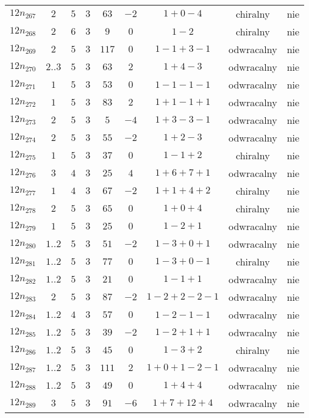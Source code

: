 \begin{longtable}{ccccccccc}
$12n_{267}$ & $2$ & $5$ & $3$ & $63$ & $-2$ & $1+0-4$ & chiralny & nie \\
$12n_{268}$ & $2$ & $6$ & $3$ & $9$ & $0$ & $1-2$ & chiralny & nie \\
$12n_{269}$ & $2$ & $5$ & $3$ & $117$ & $0$ & $1-1+3-1$ & odwracalny & nie \\
$12n_{270}$ & $2..3$ & $5$ & $3$ & $63$ & $2$ & $1+4-3$ & odwracalny & nie \\
$12n_{271}$ & $1$ & $5$ & $3$ & $53$ & $0$ & $1-1-1-1$ & odwracalny & nie \\
$12n_{272}$ & $1$ & $5$ & $3$ & $83$ & $2$ & $1+1-1+1$ & odwracalny & nie \\
$12n_{273}$ & $2$ & $5$ & $3$ & $5$ & $-4$ & $1+3-3-1$ & odwracalny & nie \\
$12n_{274}$ & $2$ & $5$ & $3$ & $55$ & $-2$ & $1+2-3$ & odwracalny & nie \\
$12n_{275}$ & $1$ & $5$ & $3$ & $37$ & $0$ & $1-1+2$ & chiralny & nie \\
$12n_{276}$ & $3$ & $4$ & $3$ & $25$ & $4$ & $1+6+7+1$ & odwracalny & nie \\
$12n_{277}$ & $1$ & $4$ & $3$ & $67$ & $-2$ & $1+1+4+2$ & chiralny & nie \\
$12n_{278}$ & $2$ & $5$ & $3$ & $65$ & $0$ & $1+0+4$ & chiralny & nie \\
$12n_{279}$ & $1$ & $5$ & $3$ & $25$ & $0$ & $1-2+1$ & odwracalny & nie \\
$12n_{280}$ & $1..2$ & $5$ & $3$ & $51$ & $-2$ & $1-3+0+1$ & odwracalny & nie \\
$12n_{281}$ & $1..2$ & $5$ & $3$ & $77$ & $0$ & $1-3+0-1$ & chiralny & nie \\
$12n_{282}$ & $1..2$ & $5$ & $3$ & $21$ & $0$ & $1-1+1$ & odwracalny & nie \\
$12n_{283}$ & $2$ & $5$ & $3$ & $87$ & $-2$ & $1-2+2-2-1$ & odwracalny & nie \\
$12n_{284}$ & $1..2$ & $4$ & $3$ & $57$ & $0$ & $1-2-1-1$ & odwracalny & nie \\
$12n_{285}$ & $1..2$ & $5$ & $3$ & $39$ & $-2$ & $1-2+1+1$ & odwracalny & nie \\
$12n_{286}$ & $1..2$ & $5$ & $3$ & $45$ & $0$ & $1-3+2$ & chiralny & nie \\
$12n_{287}$ & $1..2$ & $5$ & $3$ & $111$ & $2$ & $1+0+1-2-1$ & odwracalny & nie \\
$12n_{288}$ & $1..2$ & $5$ & $3$ & $49$ & $0$ & $1+4+4$ & odwracalny & nie \\
$12n_{289}$ & $3$ & $5$ & $3$ & $91$ & $-6$ & $1+7+12+4$ & odwracalny & nie \\

\end{longtable}
